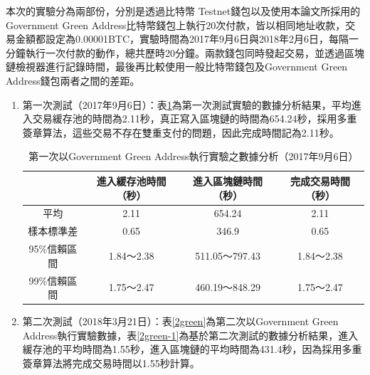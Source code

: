 		本次的實驗分為兩部份，分別是透過比特幣 Testnet錢包以及使用本論文所採用的Government Green Address比特幣錢包上執行20次付款，皆以相同地址收款，交易金額都設定為0.00001BTC，實驗時間為2017年9月6日與2018年2月6日，每隔一分鐘執行一次付款的動作，總共歷時20分鐘。兩款錢包同時發起交易，並透過區塊鏈檢視器進行記錄時間，最後再比較使用一般比特幣錢包及Government Green Address錢包兩者之間的差距。

		\begin{enumerate}
			\item 第一次測試（2017年9月6日）：表\ref{1green}為第一次測試實驗的數據分析結果，平均進入交易緩存池的時間為2.11秒，真正寫入區塊鏈的時間為654.24秒，採用多重簽章算法，這些交易不存在雙重支付的問題，因此完成時間記為2.11秒。

			\begin{table}[!htbp]
				\centering
				\caption{第一次以Government Green Address執行實驗之數據分析（2017年9月6日）}
				\label{1green}
				\begin{tabular}{|c|c|c|c|}
				\hline
				         & 進入緩存池時間（秒） & 進入區塊鏈時間（秒）    & 完成交易時間（秒） \\ \hline
				平均       & 2.11       & 654.24        & 2.11      \\ \hline
				樣本標準差    & 0.65       & 346.9         & 0.65      \\ \hline
				95\%信賴區間 & 1.84～2.38  & 511.05～797.43 & 1.84～2.38 \\ \hline
				99\%信賴區間 & 1.75～2.47  & 460.19～848.29 & 1.75～2.47 \\ \hline
				\end{tabular}
				\end{table}

			\item 第二次測試（2018年3月21日）：表\ref{2green}為第二次以Government Green Address執行實驗數據，表\ref{2green-1}為基於第二次測試的數據分析結果，進入緩存池的平均時間為1.55秒，進入區塊鏈的平均時間為431.4秒，因為採用多重簽章算法將完成交易時間以1.55秒計算。

		\end{enumerate}

